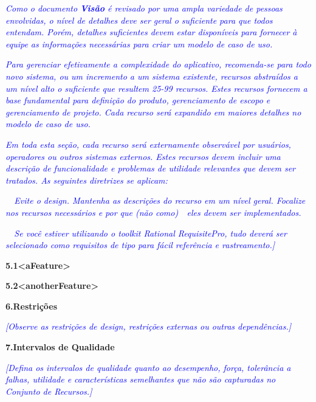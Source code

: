 \documentclass[a4paper]{article}
\begin{document}
\textit{\textcolor{blue}{Como o documento }}\textbf{\textit{\textcolor{blue}{Vis\~ao}}}\textit{\textcolor{blue}{ \'e
revisado por uma ampla variedade de pessoas envolvidas, o n\'ivel de detalhes deve ser geral o suficiente para que
todos entendam. Por\'em, detalhes suficientes devem estar dispon\'iveis para fornecer \`a equipe as informa\c{c}\~oes
necess\'arias para criar um modelo de caso de uso.}}

\textit{\textcolor{blue}{Para gerenciar efetivamente a complexidade do aplicativo, recomenda-se para todo novo sistema,
ou um incremento a um sistema existente, recursos abstra\'idos a um n\'ivel alto o suficiente que resultem 25-99
recursos. Estes recursos fornecem a base fundamental para defini\c{c}\~ao do produto, gerenciamento de escopo e
gerenciamento de projeto. Cada recurso ser\'a expandido em maiores detalhes no modelo de caso de uso.}}

\textit{\textcolor{blue}{Em toda esta se\c{c}\~ao, cada recurso ser\'a externamente observ\'avel por usu\'arios,
operadores ou outros sistemas externos. Estes recursos devem incluir uma descri\c{c}\~ao de funcionalidade e problemas
de utilidade relevantes que devem ser tratados. As seguintes diretrizes se aplicam:}}

\textcolor{blue}{{\textbullet}}\textit{\textcolor{blue}{\ \ Evite o design. Mantenha as descri\c{c}\~oes do recurso em
um n\'ivel geral. Focalize nos recursos necess\'arios e por que (n\~ao como)\ \  eles devem ser implementados.}}

\textcolor{blue}{{\textbullet}}\textit{\textcolor{blue}{\ \ Se voc\^e estiver utilizando o toolkit Rational
RequisitePro, tudo dever\'a ser selecionado como requisitos de tipo para f\'acil refer\^encia e rastreamento.]}}

\hypertarget{m1tc0ej1b5u5}{}\textbf{5.1{\textless}aFeature{\textgreater}}


\bigskip

\hypertarget{jf03z7pnew5o}{}\textbf{5.2{\textless}anotherFeature{\textgreater}}


\bigskip


\bigskip

\hypertarget{j5d69y2r6qxe}{}\textbf{6.Restri\c{c}\~oes}

\textit{\textcolor{blue}{[Observe as restri\c{c}\~oes de design, restri\c{c}\~oes externas ou outras depend\^encias.]}}

\hypertarget{gkp9w1ct89u1}{}\textbf{7.Intervalos de Qualidade}

\textit{\textcolor{blue}{[Defina os intervalos de qualidade quanto ao desempenho, for\c{c}a, toler\^ancia a falhas,
utilidade e caracter\'isticas semelhantes que n\~ao s\~ao capturadas no Conjunto de Recursos.]}}
\end{document}
